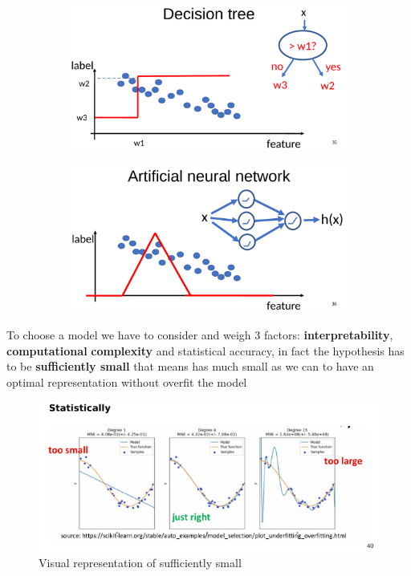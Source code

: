 \begin{figure}[H]
\centering
    \begin{subfigure}{.4\textwidth}
        \centering
        \includegraphics[width=1\linewidth]{images/3Comp/3comp4.png}
        \caption{}
        \label{fig:sub1}
    \end{subfigure}
    \begin{subfigure}{.4 \textwidth}
        \centering
        \includegraphics[width=1\linewidth]{images/3Comp/3comp5.png}
        \caption{}
        \label{fig:sub1}
    \end{subfigure}
    \caption{}
\end{figure}
To choose a model we have to consider and weigh 3 factors: \textbf{interpretability}, \textbf{computational} \textbf{complexity} and statistical accuracy, in fact the hypothesis has to be \textbf{sufficiently small} that means has much small as we can to have an optimal representation without overfit the model
\begin{figure}[H]
    \centering
    \includegraphics[scale=0.5]{images/3Comp/3comp6.png}
    \caption{Visual representation of sufficiently small}
    \label{fig:enter-label}
\end{figure}

